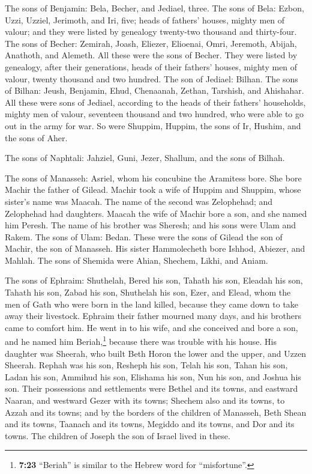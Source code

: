  The sons of Benjamin: Bela, Becher, and Jediael, three.
 The sons of Bela: Ezbon, Uzzi, Uzziel, Jerimoth, and Iri,
five; heads of fathers' houses, mighty men of valour; and they were
listed by genealogy twenty-two thousand and thirty-four. 
The sons of Becher: Zemirah, Joash, Eliezer, Elioenai, Omri, Jeremoth,
Abijah, Anathoth, and Alemeth. All these were the sons of Becher.
 They were listed by genealogy, after their generations,
heads of their fathers' houses, mighty men of valour, twenty thousand
and two hundred.  The son of Jediael: Bilhan. The sons of
Bilhan: Jeush, Benjamin, Ehud, Chenaanah, Zethan, Tarshish, and
Ahishahar.  All these were sons of Jediael, according to
the heads of their fathers' households, mighty men of valour, seventeen
thousand and two hundred, who were able to go out in the army for war.
 So were Shuppim, Huppim, the sons of Ir, Hushim, and the
sons of Aher.

 The sons of Naphtali: Jahziel, Guni, Jezer, Shallum, and
the sons of Bilhah.

 The sons of Manasseh: Asriel, whom his concubine the
Aramitess bore. She bore Machir the father of Gilead. 
Machir took a wife of Huppim and Shuppim, whose sister's name was
Maacah. The name of the second was Zelophehad; and Zelophehad had
daughters.  Maacah the wife of Machir bore a son, and she
named him Peresh. The name of his brother was Sheresh; and his sons were
Ulam and Rakem.  The sons of Ulam: Bedan. These were the
sons of Gilead the son of Machir, the son of Manasseh. 
His sister Hammolecheth bore Ishhod, Abiezer, and Mahlah.
 The sons of Shemida were Ahian, Shechem, Likhi, and
Aniam.

 The sons of Ephraim: Shuthelah, Bered his son, Tahath
his son, Eleadah his son, Tahath his son,  Zabad his son,
Shuthelah his son, Ezer, and Elead, whom the men of Gath who were born
in the land killed, because they came down to take away their livestock.
 Ephraim their father mourned many days, and his brothers
came to comfort him.  He went in to his wife, and she
conceived and bore a son, and he named him Beriah,\footnote{\textbf{7:23}
  ``Beriah'' is similar to the Hebrew word for ``misfortune''.} because
there was trouble with his house.  His daughter was
Sheerah, who built Beth Horon the lower and the upper, and Uzzen
Sheerah.  Rephah was his son, Resheph his son, Telah his
son, Tahan his son,  Ladan his son, Ammihud his son,
Elishama his son,  Nun his son, and Joshua his son.
 Their possessions and settlements were Bethel and its
towns, and eastward Naaran, and westward Gezer with its towns; Shechem
also and its towns, to Azzah and its towns;  and by the
borders of the children of Manasseh, Beth Shean and its towns, Taanach
and its towns, Megiddo and its towns, and Dor and its towns. The
children of Joseph the son of Israel lived in these.


